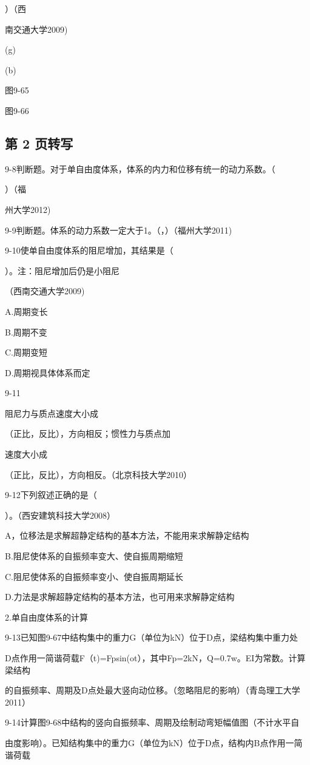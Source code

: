 ）（西

南交通大学2009)

(g)

(b)

图9-65

图9-66

\subsection*{第 2 页转写}
9-8判断题。对于单自由度体系，体系的内力和位移有统一的动力系数。（

）（福

州大学2012)

9-9判断题。体系的动力系数一定大于1。（，）（福州大学2011)

9-10使单自由度体系的阻尼增加，其结果是（

）。注：阻尼增加后仍是小阻尼

（西南交通大学2009)

A.周期变长

B.周期不变

C.周期变短

D.周期视具体体系而定

9-11

阻尼力与质点速度大小成

（正比，反比），方向相反；惯性力与质点加

速度大小成

（正比，反比），方向相反。（北京科技大学2010）

9-12下列叙述正确的是（

）。（西安建筑科技大学2008）

A，位移法是求解超静定结构的基本方法，不能用来求解静定结构

B.阻尼使体系的自振频率变大、使自振周期缩短

C.阻尼使体系的自振频率变小、使自振周期延长

D.力法是求解超静定结构的基本方法，也可用来求解静定结构

2.单自由度体系的计算

9-13已知图9-67中结构集中的重力G（单位为kN）位于D点，梁结构集中重力处

D点作用一简谐荷载F（t)=Fpsin(ot），其中Fp=2kN，Q=0.7w。EI为常数。计算梁结构

的自振频率、周期及D点处最大竖向动位移。（忽略阻尼的影响）（青岛理工大学2011）

9-14计算图9-68中结构的竖向自振频率、周期及绘制动弯矩幅值图（不计水平自

由度影响）。已知结构集中的重力G（单位为kN）位于D点，结构内B点作用一简谐荷载

